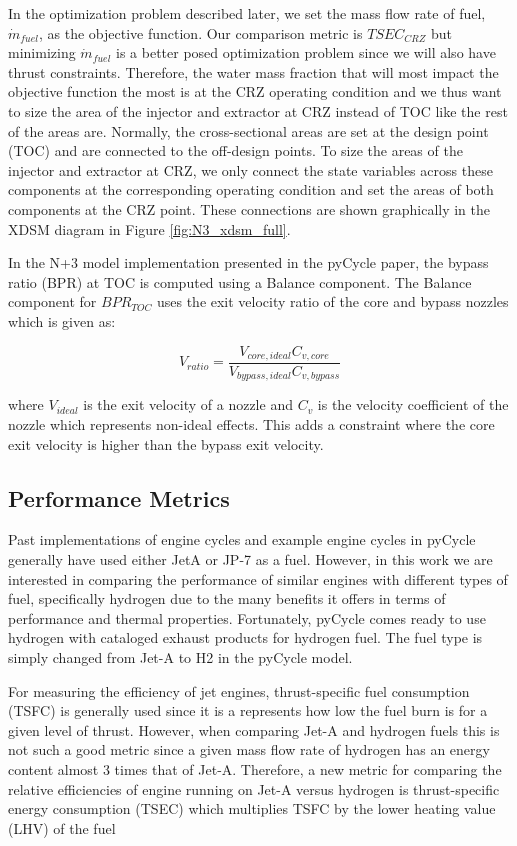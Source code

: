 \documentclass[conf]{new-aiaa}
\begin{document}
In the optimization problem described later, we set the mass flow rate of fuel, $\dot{m}_{fuel}$, as the objective function.
Our comparison metric is $TSEC_{CRZ}$ but minimizing $\dot{m}_{fuel}$ is a better posed optimization problem since we will also have thrust constraints.
Therefore, the water mass fraction that will most impact the objective function the most is at the CRZ operating condition and we thus want to size the area of the injector and extractor at CRZ instead of TOC like the rest of the areas are.
Normally, the cross-sectional areas are set at the design point (TOC) and are connected to the off-design points.
To size the areas of the injector and extractor at CRZ, we only connect the state variables across these components at the corresponding operating condition and set the areas of both components at the CRZ point.
These connections are shown graphically in the XDSM diagram in Figure \ref{fig:N3_xdsm_full}.

In the N+3 model implementation presented in the pyCycle paper, the bypass ratio (BPR) at TOC is computed using a Balance component.
The Balance component for $BPR_{TOC}$ uses the exit velocity ratio of the core and bypass nozzles which is given as:

\begin{equation}
  V_{ratio} = \frac{V_{core,ideal}C_{v,core}}{V_{bypass,ideal}C_{v,bypass}}
\end{equation}

\noindent
where $V_{ideal}$ is the exit velocity of a nozzle and $C_v$ is the velocity coefficient of the nozzle which represents non-ideal effects.
This adds a constraint where the core exit velocity is higher than the bypass exit velocity.

\subsection{Performance Metrics}
Past implementations of engine cycles and example engine cycles in pyCycle generally have used either JetA or JP-7 as a fuel.
However, in this work we are interested in comparing the performance of similar engines with different types of fuel, specifically hydrogen due to the many benefits it offers in terms of performance and thermal properties.
Fortunately, pyCycle comes ready to use hydrogen with cataloged exhaust products for hydrogen fuel.
The fuel type is simply changed from Jet-A to H2 in the pyCycle model.

For measuring the efficiency of jet engines, thrust-specific fuel consumption (TSFC) is generally used since it is a represents how low the fuel burn is for a given level of thrust.
However, when comparing Jet-A and hydrogen fuels this is not such a good metric since a given mass flow rate of hydrogen has an energy content almost 3 times that of Jet-A.
Therefore, a new metric for comparing the relative efficiencies of engine running on Jet-A versus hydrogen is thrust-specific energy consumption (TSEC) which multiplies TSFC by the lower heating value (LHV) of the fuel %
\end{document}
